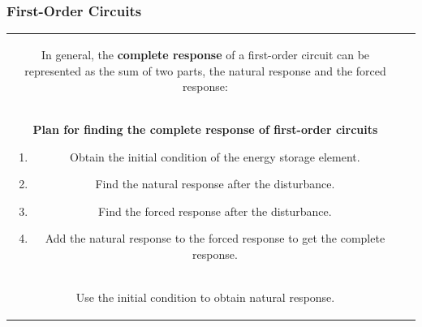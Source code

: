 \documentclass[aspectratio=169]{beamer}
\begin{document}
\begin{frame}[fragile]
	\frametitle{First-Order Circuits}
		\begin{tabular}{cc}
			\begin{columns}
				\begin{column}{1\textwidth}  %
In general, the \textbf{complete response} of a first-order circuit can be represented as the sum of two
parts, the natural response and the forced response:

				\end{column}
			\end{columns}\\
		
\begin{columns}
	\begin{column}{1\textwidth}  %
\center \textbf{Plan for finding the complete response of first-order circuits} 
\small		\begin{enumerate}
					\item {\small Obtain the initial condition of the energy storage element.}
					\item { \small  Find the natural response after the disturbance.}
					\item { \small  Find the forced response after the disturbance.}
					\item { \small  Add the natural response to the forced response to get the complete response.}	

					\end{enumerate}
			
				\end{column}
		\end{columns}\\

	
	
	\begin{columns}
	\begin{column}{1\textwidth}  %
\newline \newline  \small Use the initial condition to obtain natural response.
	
			
				\end{column}
		\end{columns}\\
	
		
	\end{tabular}	
	
\end{frame}
\end{document}

